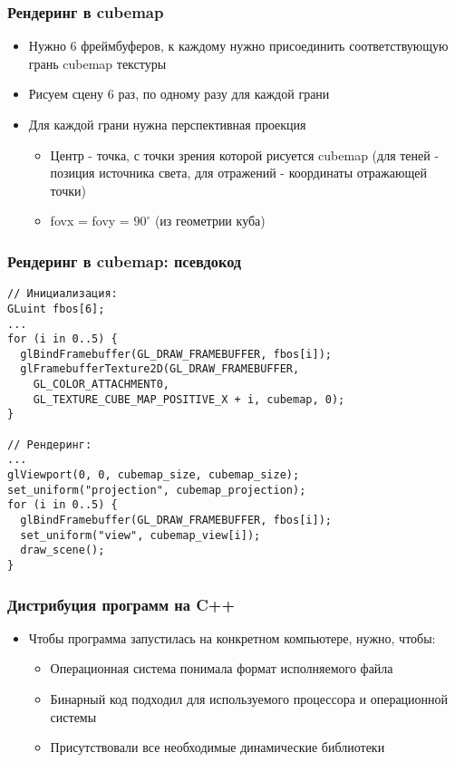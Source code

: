 \documentclass{beamer}
\begin{document}
\begin{frame}[fragile]
\frametitle{Рендеринг в cubemap}
\begin{itemize}
\item Нужно 6 фреймбуферов, к каждому нужно присоединить соответствующую грань cubemap текстуры
\pause
\item Рисуем сцену 6 раз, по одному разу для каждой грани
\pause
\item Для каждой грани нужна перспективная проекция
\begin{itemize}
\item Центр - точка, с точки зрения которой рисуется cubemap (для теней - позиция источника света, для отражений - координаты отражающей точки)
\pause
\item fovx = fovy = \begin{math}90^\circ\end{math} (из геометрии куба)
\end{itemize}
\end{itemize}
\end{frame}

\begin{frame}[fragile]
\frametitle{Рендеринг в cubemap: псевдокод}
\fontsize{10pt}{10pt}
\begin{verbatim}
// Инициализация:
GLuint fbos[6];
... 
for (i in 0..5) {
  glBindFramebuffer(GL_DRAW_FRAMEBUFFER, fbos[i]);
  glFramebufferTexture2D(GL_DRAW_FRAMEBUFFER,
    GL_COLOR_ATTACHMENT0, 
    GL_TEXTURE_CUBE_MAP_POSITIVE_X + i, cubemap, 0);
}

// Рендеринг:
...
glViewport(0, 0, cubemap_size, cubemap_size);
set_uniform("projection", cubemap_projection);
for (i in 0..5) {
  glBindFramebuffer(GL_DRAW_FRAMEBUFFER, fbos[i]);
  set_uniform("view", cubemap_view[i]);
  draw_scene();
}
\end{verbatim}
\end{frame}

\begin{frame}[fragile]
\frametitle{Дистрибуция программ на C++}
\begin{itemize}
\item Чтобы программа запустилась на конкретном компьютере, нужно, чтобы:
\pause
\begin{itemize}
\item Операционная система понимала формат исполняемого файла
\pause
\item Бинарный код подходил для используемого процессора и операционной системы
\pause
\item Присутствовали все необходимые динамические библиотеки
\end{itemize}
\end{itemize}
\end{frame}
\end{document}
